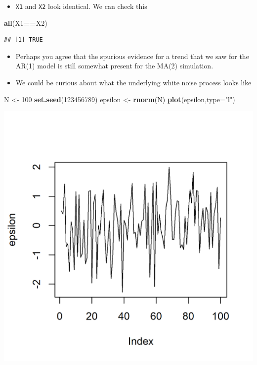\documentclass[]{article}
\newenvironment{Shaded}{\begin{snugshade}}{\end{snugshade}}
\newcommand{\KeywordTok}[1]{\textcolor[rgb]{0.13,0.29,0.53}{\textbf{#1}}}
\newcommand{\DataTypeTok}[1]{\textcolor[rgb]{0.13,0.29,0.53}{#1}}
\newcommand{\DecValTok}[1]{\textcolor[rgb]{0.00,0.00,0.81}{#1}}
\newcommand{\StringTok}[1]{\textcolor[rgb]{0.31,0.60,0.02}{#1}}
\newcommand{\OperatorTok}[1]{\textcolor[rgb]{0.81,0.36,0.00}{\textbf{#1}}}
\newcommand{\NormalTok}[1]{#1}
\providecommand{\tightlist}{%
  \setlength{\itemsep}{0pt}\setlength{\parskip}{0pt}}
\begin{document}
\begin{itemize}
\tightlist
\item
  \texttt{X1} and \texttt{X2} look identical. We can check this
\end{itemize}

\begin{Shaded}
\begin{Highlighting}[]
\KeywordTok{all}\NormalTok{(X1}\OperatorTok{==}\NormalTok{X2)}
\end{Highlighting}
\end{Shaded}

\begin{verbatim}
## [1] TRUE
\end{verbatim}

\begin{itemize}
\item
  Perhaps you agree that the spurious evidence for a trend that we saw
  for the AR(1) model is still somewhat present for the MA(2)
  simulation.
\item
  We could be curious about what the underlying white noise process
  looks like
\end{itemize}

\begin{Shaded}
\begin{Highlighting}[]
\NormalTok{N <-}\StringTok{ }\DecValTok{100}
\KeywordTok{set.seed}\NormalTok{(}\DecValTok{123456789}\NormalTok{)}
\NormalTok{epsilon <-}\StringTok{ }\KeywordTok{rnorm}\NormalTok{(N)}
\KeywordTok{plot}\NormalTok{(epsilon,}\DataTypeTok{type=}\StringTok{"l"}\NormalTok{)}
\end{Highlighting}
\end{Shaded}

\includegraphics{figure/intro-noise_sim-1.png}
\end{document}

